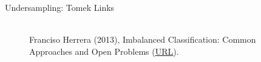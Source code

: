 \documentclass[11pt,compress,t,notes=noshow, xcolor=table]{beamer}
\begin{document}
\begin{frame}{Undersampling: Tomek Links}
{\begin{minipage}{0.55\textwidth}
\begin{itemize}
			\end{itemize}		
			\end{minipage}
%		
			\begin{minipage}{0.4\textwidth}
				\begin{figure}
					\centering
								\tiny
					\\ Franciso Herrera (2013), Imbalanced Classification: Common
					Approaches and Open Problems (\href{https://sci2s.ugr.es/sites/default/files/files/TutorialsAndPlenaryTalks/SSTiC-Trends in-Classification-Imbalanced-data-sets.pdf}{\underline{URL}}).
				\end{figure}
			\end{minipage}
		}
	\end{frame}
	
	
	
\end{document}

